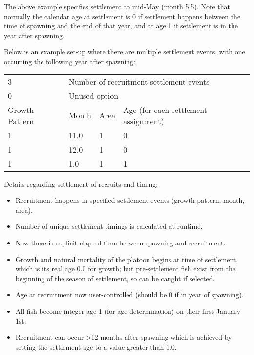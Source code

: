 The above example specifies settlement to mid-May (month 5.5). Note that normally the calendar age at settlement is 0 if settlement happens between the time of spawning and the end of that year, and at age 1 if settlement is in the year after spawning. 

Below is an example set-up where there are multiple settlement events, with one occurring the following year after spawning: 
\begin{center}
	\vspace*{-\baselineskip}
	\begin{tabular}{p{3cm} p{3cm} p{2cm} p{7cm}}
		\hline
		3 & \multicolumn{3}{l}{Number of recruitment settlement events} \Tstrut\\
		0 & \multicolumn{3}{l}{Unused option} \Bstrut\\
		\hline
		Growth Pattern & Month & Area & Age (for each settlement assignment) \Tstrut\Bstrut\\
		\hline
		1 & 11.0 & 1 & 0 \Tstrut\\
		1 & 12.0 & 1 & 0 \\
		1 & 1.0 & 1 & 1 \Bstrut\\
		\hline
	\end{tabular}		
\end{center}

Details regarding settlement of recruits and timing:
	\begin{itemize}
		\item Recruitment happens in specified settlement events (growth pattern, month, area).
		\item Number of unique settlement timings is calculated at runtime.
		\item Now there is explicit elapsed time between spawning and recruitment.
		\item Growth and natural mortality of the platoon begins at time of settlement, which is its real age 0.0 for growth; but pre-settlement fish exist from the beginning of the season of settlement, so can be caught if selected.
		\item Age at recruitment now user-controlled (should be 0 if in year of spawning).
		\item All fish become integer age 1 (for age determination) on their first January 1st.
		\item Recruitment can occur >12 months after spawning which is achieved by setting the settlement age to a value greater than 1.0.		
	\end{itemize}

